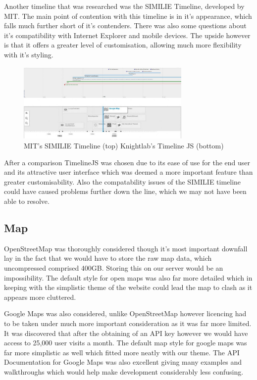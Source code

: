 \documentclass{l3proj}
\begin{document}
Another timeline that was researched was the SIMILIE Timeline, developed by MIT. The main point of contention with this timeline is in it’s appearance, which falls much further short of it’s contenders. There was also some questions about it’s compatibility with Internet Explorer and mobile devices. The upside however is that it offers a greater level of customisation, allowing much more flexibility with it’s styling.

\begin{figure}[ht!]
  \centering
\includegraphics[width=0.75\textwidth]{images/similie_knightlab_timeline.jpg}
\caption{MIT's SIMILIE Timeline (top) Knightlab's Timeline JS (bottom)}
\end{figure}

After a comparison TimelineJS was chosen due to its ease of use for the end user and its attractive user interface which was deemed a more important feature than greater customisability. Also the compatability issues of the SIMILIE timeline could have caused problems further down the line, which we may not have been able to resolve.


\subsection{Map}

OpenStreetMap was thoroughly considered though it’s most important downfall lay in the fact that we would have to store the raw map data, which uncompressed comprised 400GB. Storing this on our server would be an impossibility. The default style for open maps was also far more detailed which in keeping with the simplistic theme of the website could lead the map to clash as it appears more cluttered.

Google Maps was also considered, unlike OpenStreetMap however licencing had to be taken under much more important consideration as it was far more limited. It was discovered that after the obtaining of an API key however we would have access to 25,000 user visits a month. The default map style for google maps was far more simplistic as well which fitted more neatly with our theme. The API Documentation for Google Maps was also excellent giving many examples and walkthroughs which would help make development considerably less confusing.
\end{document}
